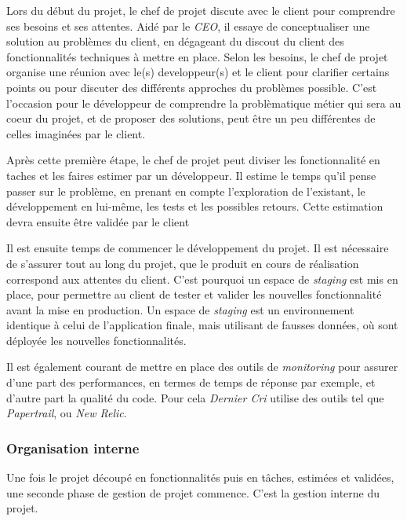 Lors du début du projet, le chef de projet discute avec le client pour
comprendre ses besoins et ses attentes. Aidé par le \emph{CEO}, il
essaye de conceptualiser une solution au problèmes du client, en
dégageant du discout du client des fonctionnalités techniques à mettre
en place. Selon les besoins, le chef de projet organise une réunion avec
le(s) developpeur(s) et le client pour clarifier certains points ou pour
discuter des différents approches du problèmes possible. C'est
l'occasion pour le développeur de comprendre la problèmatique métier qui
sera au coeur du projet, et de proposer des solutions, peut être un peu
différentes de celles imaginées par le client.

\bigskip

Après cette première étape, le chef de projet peut diviser les
fonctionnalité en taches et les faires estimer par un développeur. Il
estime le temps qu'il pense passer sur le problème, en prenant en compte
l'exploration de l'existant, le développement en lui-même, les tests et
les possibles retours. Cette estimation devra ensuite être validée par
le client

\bigskip

Il est ensuite temps de commencer le développement du projet. Il est
nécessaire de s'assurer tout au long du projet, que le produit en cours
de réalisation correspond aux attentes du client. C'est pourquoi un
espace de \emph{staging} est mis en place, pour permettre au client de
tester et valider les nouvelles fonctionnalité avant la mise en
production. Un espace de \emph{staging} est un environnement identique à
celui de l'application finale, mais utilisant de fausses données, où
sont déployée les nouvelles fonctionnalités.

\bigskip

Il est également courant de mettre en place des outils de
\emph{monitoring} pour assurer d'une part des performances, en termes de
temps de réponse par exemple, et d'autre part la qualité du code. Pour
cela \emph{Dernier Cri} utilise des outils tel que \emph{Papertrail}, ou
\emph{New Relic}.

\bigskip

\subsubsection{Organisation interne}\label{organisation-interne}

\bigskip

Une fois le projet découpé en fonctionnalités puis en tâches, estimées
et validées, une seconde phase de gestion de projet commence. C'est la
gestion interne du projet.

